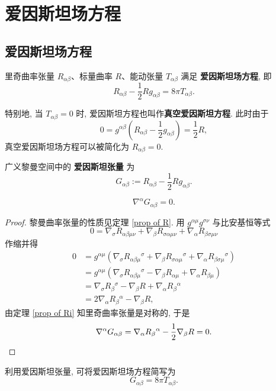 \section{爱因斯坦场方程}
\subsection{爱因斯坦场方程}
\begin{axiom}[爱因斯坦场方程]
	里奇曲率张量 $R_{\alpha\beta}$、标量曲率 $R$、能动张量 $T_{\alpha\beta}$ 满足 {\bf 爱因斯坦场方程}, 即
	\[ R_{\alpha\beta}-\frac{1}{2}Rg_{\alpha\beta}=8\pi T_{\alpha\beta}.\]
\end{axiom}
特别地, 当 $T_{\alpha\beta}=0$ 时, 爱因斯坦方程也叫作{\bf 真空爱因斯坦方程}. 此时由于
\[ 0=g^{\alpha\beta}\left( R_{\alpha\beta}-\frac{1}{2}g_{\alpha\beta} \right)=\frac{1}{2}R, \] 
真空爱因斯坦场方程可以被简化为 $ R_{\alpha\beta}=0 $. 
\begin{definition}[爱因斯坦张量]
	广义黎曼空间中的 {\bf 爱因斯坦张量} 为
	\[ G_{\alpha\beta}:=R_{\alpha\beta}-\frac{1}{2}Rg_{\alpha\beta}. \] 
\end{definition}
\begin{proposition}\keepline
	\[ \nabla^\alpha G_{\alpha\beta}=0. \] 
\end{proposition}
\begin{proof}
	黎曼曲率张量的性质见定理 \ref{prop of R}. 用 $g^{\alpha\mu}g^{\sigma\nu}$ 与比安基恒等式
	\[ 0=\nabla_\sigma R_{\alpha\beta\mu\nu}+\nabla_{\beta}R_{\sigma\alpha\mu\nu}+\nabla_{\alpha}R_{\beta\sigma\mu\nu} \]
	作缩并得
	\begin{align*}
		0 &= g^{\alpha\mu}\left( \nabla_\sigma R_{\alpha\beta\mu}{}^{\sigma}+\nabla_{\beta}R_{\sigma\alpha\mu}{}^{\sigma}+\nabla_{\alpha}R_{\beta\sigma\mu}{}^{\sigma} \right)\\
		&= g^{\alpha\mu}\left( \nabla_\sigma R_{\alpha\beta\mu}{}^{\sigma}-\nabla_\beta R_{\alpha\mu}+\nabla_\alpha R_{\beta\mu} \right)\\
		&= \nabla_{\sigma}R_{\beta}{}^{\sigma}-\nabla_\beta R+\nabla_\alpha R_{\beta}{}^{\alpha}\\
		&=2\nabla_\alpha R_{\beta}{}^{\alpha}-\nabla_{\beta} R,
	\end{align*}
	由定理 \ref{prop of Ri} 知里奇曲率张量是对称的, 于是
	\[ \nabla^\alpha G_{\alpha\beta} =\nabla_\alpha R_{\beta}{}^{\alpha}-\frac{1}{2}\nabla_\beta R=0.\qedhere \]
\end{proof}
利用爱因斯坦张量, 可将爱因斯坦场方程简写为
\[ G_{\alpha\beta}=8\pi T_{\alpha\beta}. \] 

